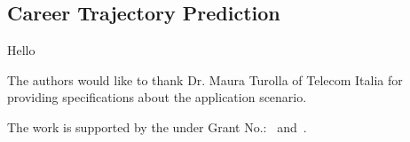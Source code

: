 \subsection{Career Trajectory Prediction}
Hello



\begin{acks}

The authors would like to thank Dr. Maura Turolla of Telecom
Italia for providing specifications about the application scenario.

The work is supported by the  under Grant
No.:~
and~.


\end{acks}



